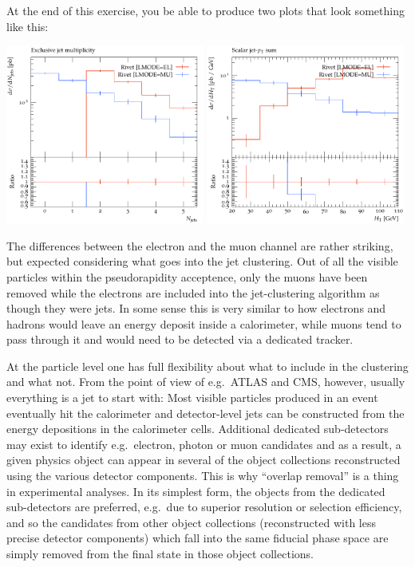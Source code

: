 \documentclass[10pt,fleqn]{scrartcl}
\theoremstyle{exstyle}
\begin{document}
At the end of this exercise, you be able to produce two plots that
look something like this:

\begin{center}
\includegraphics[width=0.49\textwidth]{figures/jets_excl_no_olr.pdf}
\includegraphics[width=0.49\textwidth]{figures/HT_no_olr.pdf}
\end{center}

The differences between the electron and the muon channel are rather striking,
but expected considering what goes into the jet clustering. 
Out of all the visible particles within the pseudorapidity acceptence,
only the muons have been removed while the electrons are included
into the jet-clustering algorithm as though they were jets.
In some sense this is very similar to how electrons and hadrons would leave 
an energy deposit inside a calorimeter, while muons tend to pass through it
and would need to be detected via a dedicated tracker.

At the particle level one has full flexibility about what to include in the clustering
and what not. From the point of view of e.g.\ ATLAS and CMS, however,
usually everything is a jet to start with: 
Most visible particles produced in an event eventually hit the calorimeter and
detector-level jets can be constructed from the energy depositions in the calorimeter cells.
Additional dedicated sub-detectors may exist to identify e.g.\ electron, photon or muon candidates
and as a result, a given physics object can appear in several of the object collections
reconstructed using the various detector components.
This is why ``overlap removal'' is a thing in experimental analyses.
In its simplest form, the objects from the dedicated sub-detectors are preferred, 
e.g.\ due to superior resolution or selection efficiency, and so the candidates
from other object collections (reconstructed with less precise detector components)
which fall into the same fiducial phase space are simply removed from the final state
in those object collections.
\end{document}
